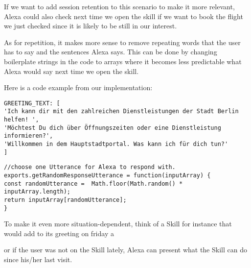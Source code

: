 \noindent If we want to add session retention to this scenario to make it more relevant, Alexa could also check next time we open the skill if we want to book the flight we just checked since it is likely to be still in our interest.

As for repetition, it makes more sense to remove repeating words that the user has to say and the sentences Alexa says. This can be done by changing boilerplate strings in the code to arrays where it becomes less predictable what Alexa would say next time we open the skill.

\noindent  Here is a code example from our implementation:

\begin{verbatim}
GREETING_TEXT: [
'Ich kann dir mit den zahlreichen Dienstleistungen der Stadt Berlin helfen! ',
'Möchtest Du dich über Öffnungszeiten oder eine Dienstleistung informieren?',
'Willkommen in dem Hauptstadtportal. Was kann ich für dich tun?'
]
\end{verbatim}

\begin{verbatim}
//choose one Utterance for Alexa to respond with.
exports.getRandomResponseUtterance = function(inputArray) {
const randomUtterance =  Math.floor(Math.random() * inputArray.length);
return inputArray[randomUtterance];
}
\end{verbatim}

\noindent To make it even more situation-dependent, think of a Skill for instance that would add to its greeting on friday a 


\begin{flushright}
\end{flushright}


\noindent or if the user was not on the Skill lately, Alexa can present what the Skill can do since his/her last visit.





